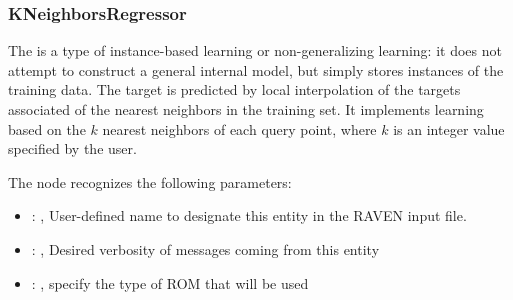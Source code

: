\subsubsection{KNeighborsRegressor}
  The  is a type of instance-based learning or
  non-generalizing learning: it does not attempt to construct a general internal
  model, but simply stores instances of the training data.                          The target is
  predicted by local interpolation of the targets associated                          of the nearest
  neighbors in the training set.                          It implements learning based on the $k$
  nearest neighbors of each query point,                          where $k$ is an integer value
  specified by the user.                          

  The  node recognizes the following parameters:
    \begin{itemize}
      \item {}: , 
        User-defined name to designate this entity in the RAVEN input file.
      \item {}: , 
        Desired verbosity of messages coming from this entity
      \item {}: , 
        specify the type of ROM that will be used
  \end{itemize}

